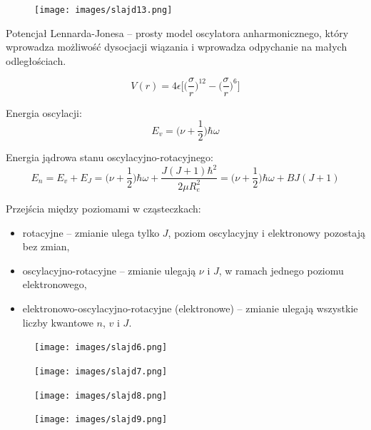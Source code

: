 \documentclass{article}
\begin{document}
\begin{figure}[H]
    \centering
    \texttt{[image: images/slajd13.png]}
\end{figure}

Potencjał Lennarda-Jonesa -- prosty model oscylatora anharmonicznego, który wprowadza możliwość dysocjacji wiązania i wprowadza odpychanie na małych odległościach.

\begin{equation*}
    V(r)=4\epsilon\bigg[\bigg(\frac{\sigma}{r}\bigg)^{12} - \bigg(\frac{\sigma}{r}\bigg)^{6} \bigg]
\end{equation*}

Energia oscylacji:
\begin{equation*}
    E_v=\bigg(\nu +\frac{1}{2}\bigg)\hbar\omega
\end{equation*}

Energia jądrowa stanu oscylacyjno-rotacyjnego:
\begin{equation*}
    E_n=E_v+E_J=\bigg(\nu +\frac{1}{2}\bigg)\hbar\omega+\frac{J(J+1)\hbar^2}{2\mu R_e^2}=\bigg(\nu +\frac{1}{2}\bigg)\hbar\omega+BJ(J+1)
\end{equation*}

Przejścia między poziomami w cząsteczkach:
\begin{itemize}
    \item rotacyjne -- zmianie ulega tylko $J$, poziom oscylacyjny i elektronowy pozostają bez zmian,
    \item oscylacyjno-rotacyjne -- zmianie ulegają $\nu$ i $J$, w ramach jednego poziomu elektronowego,
    \item elektronowo-oscylacyjno-rotacyjne (elektronowe) -- zmianie ulegają wszystkie liczby kwantowe $n$, $v$ i $J$.
\end{itemize}

\begin{figure}[H]
    \centering
    \texttt{[image: images/slajd6.png]}
\end{figure}

\begin{figure}[H]
    \centering
    \texttt{[image: images/slajd7.png]}
\end{figure}

\begin{figure}[H]
    \centering
    \texttt{[image: images/slajd8.png]}
\end{figure}

\begin{figure}[H]
    \centering
    \texttt{[image: images/slajd9.png]}
\end{figure}
\end{document}
